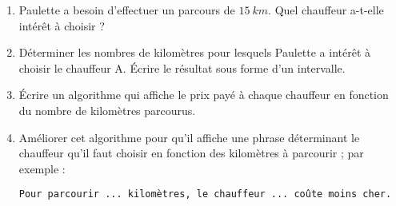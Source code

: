 \documentclass[10pt,openright,twoside,french]{book}
\begin{document}
\begin{enumerate}
    \item Paulette a besoin d'effectuer un parcours de $15~km$. Quel chauffeur a-t-elle intérêt à choisir ?
    \item Déterminer les nombres de kilomètres pour lesquels Paulette a intérêt à choisir le chauffeur A. \'Ecrire le résultat sous forme d'un intervalle.
    \item \'Ecrire un algorithme qui affiche le prix payé à chaque chauffeur en fonction du nombre de kilomètres parcourus.
    \item Améliorer cet algorithme pour qu'il affiche une phrase déterminant le chauffeur qu'il faut choisir en fonction des kilomètres à parcourir ; par exemple :
    \begin{center}
        \texttt{Pour parcourir ... kilomètres, le chauffeur ... coûte moins cher.}
    \end{center}
\end{enumerate}
\end{document}
